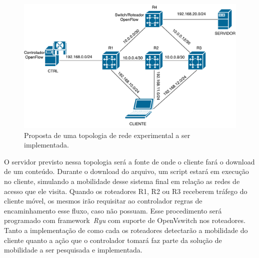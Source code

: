 \documentclass[	12pt, Times, openright, twoside, a4paper, english, brazil]{abntex2}
\begin{document}
\begin{figure}[ht]
    \begin{center}  
    \includegraphics[width=400pt]{rede-experimento-1-27122016.pdf}
    \caption{Proposta de uma topologia de rede experimental a ser implementada.}
    \label{fig:Proposta_Topologia_Experimento}
    \end{center}
\end{figure}


O servidor previsto nessa topologia será a fonte de onde o cliente fará o download de um conteúdo. Durante o download do arquivo, um script estará em execução no cliente, simulando a mobilidade desse sistema final em relação as redes de acesso que ele visita. Quando os roteadores R1, R2 ou R3 receberem tráfego do cliente móvel, os mesmos irão requisitar ao controlador regras de encaminhamento esse fluxo, caso não possuam. Esse procedimento será programado com framework~\textit{Ryu} com suporte de OpenVswitch nos roteadores. Tanto a implementação de como cada os roteadores detectarão a mobilidade do cliente quanto a ação que o controlador tomará faz parte da solução de mobilidade a ser  pesquisada e implementada.
\end{document}
